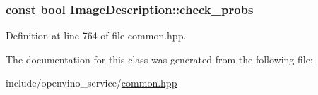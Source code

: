 \subsubsection[{\texorpdfstring{check\+\_\+probs}{check_probs}}]{\setlength{\rightskip}{0pt plus 5cm}const bool Image\+Description\+::check\+\_\+probs}\hypertarget{classImageDescription_a4df135809acd954ad6882c2b805b2a5b}{}\label{classImageDescription_a4df135809acd954ad6882c2b805b2a5b}


Definition at line 764 of file common.\+hpp.



The documentation for this class was generated from the following file\+:\begin{DoxyCompactItemize}
\item 
include/openvino\+\_\+service/\hyperlink{common_8hpp}{common.\+hpp}\end{DoxyCompactItemize}
